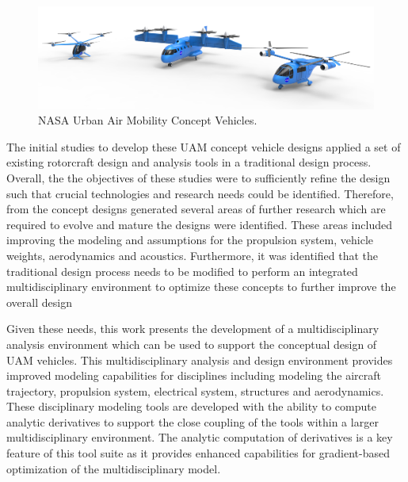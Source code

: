 \begin{figure}
\begin{center}
 \includegraphics[width=1.0\textwidth]{../Images/UAM_GROUP1.jpg}
 \caption{NASA Urban Air Mobility Concept Vehicles.}
 \label{f:UAM}
\end{center}
\end{figure}



The initial studies to develop these UAM concept vehicle designs applied a set of existing rotorcraft design and analysis tools in a traditional design process.
Overall, the the objectives of these studies were to sufficiently refine the design such that crucial technologies and research needs could be identified. 
Therefore, from the concept designs generated several areas of further research which are required to evolve and mature the designs were identified.
These areas included improving the modeling and assumptions for the propulsion system, vehicle weights, aerodynamics and acoustics.\cite{johnson2018concept}
Furthermore, it was identified that the traditional design process needs to be modified to perform an integrated multidisciplinary environment to optimize these concepts to further improve the overall design

Given these needs, this work presents the development of a multidisciplinary analysis environment which can be used to support the conceptual design of UAM vehicles.
This multidisciplinary analysis and design environment provides improved modeling capabilities for disciplines including modeling the aircraft trajectory, propulsion system, electrical system, structures and aerodynamics. %
These disciplinary modeling tools are developed with the ability to compute analytic derivatives to support the close coupling of the tools within a larger multidisciplinary environment.
The analytic computation of derivatives is a key feature of this tool suite as it provides enhanced capabilities for gradient-based optimization of the multidisciplinary model. 

